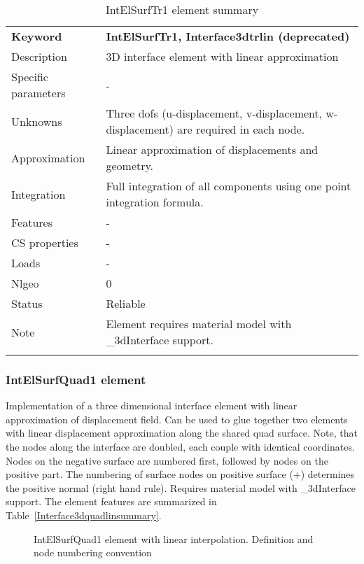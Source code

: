 \documentclass[a4paper]{article}
\newcommand{\param}[1]{\texttt{#1}} %
\newcommand{\templabel}{}%
\newcommand{\tempcaption}{}%
\newcounter{nelpar}
\newenvironment{elementsummary}[5]{%
  \gdef\tempcaption{#4}%
  \gdef\templabel{#5}%
  \setcounter{nelpar}{0}%
  \begin{center} %
    \begin{table}[!htb] %
      \begin{tabular}{|l|p{9cm}|}\hline %
        {\bf Keyword} & \bf{#1}\\ %
        {Description} & {#2}\\ %
        {Specific parameters} & {#3}\\ \hline %
}{
  \\ \hline %
      \end{tabular}%
      \caption{\tempcaption}%
      \label{\templabel}%
    \end{table}%
  \end{center}%
}
\newcommand{\elementParam}[1]{%
  \ifthenelse{\value{nelpar}>0} %
             {&{#1}}%
             {\setcounter{nelpar}{1}Parameters&{#1}}%
             \\%
}
\newcommand{\elementDescription}[2]{{#1} & {#2}\\ }
\begin{document}
\begin{elementsummary}{IntElSurfTr1, Interface3dtrlin (deprecated)}{3D  interface element with linear approximation}{-}{IntElSurfTr1 element summary}{Interface3dtrlinsummary}
\elementDescription{Unknowns}{Three dofs (u-displacement, v-displacement, w-displacement) are required in each node.}
\elementDescription{Approximation}{Linear approximation of displacements and geometry.}
\elementDescription{Integration}{Full integration of all components using one point integration formula.}
\elementDescription{Features}{-}
\elementDescription{CS properties}{-}
\elementDescription{Loads}{-}
\elementDescription{Nlgeo}{0}
\elementDescription{Status}{Reliable}
\elementDescription{Note}{Element requires material model with \_3dInterface support.}
\end{elementsummary}

\subsubsection{IntElSurfQuad1 element}
Implementation of a three dimensional interface element with linear
approximation of displacement field. Can be used to glue together two elements with linear displacement approximation along the shared quad surface. Note, that the nodes along the interface are doubled, each couple with identical coordinates. Nodes on the negative surface are numbered first, followed by nodes on the positive part. The numbering of surface nodes on positive surface (+) determines the positive normal (right hand rule). Requires material model with \_3dInterface support. The element features are summarized in Table~\ref{Interface3dquadlinsummary}.

\begin{figure}[htb]
 \centering
 \begin{makeimage}
  
 \end{makeimage}
 \caption{IntElSurfQuad1 element with linear interpolation. Definition and node numbering convention}
 \label{interf3dquad_lin_fig}
\end{figure}
\end{document}
